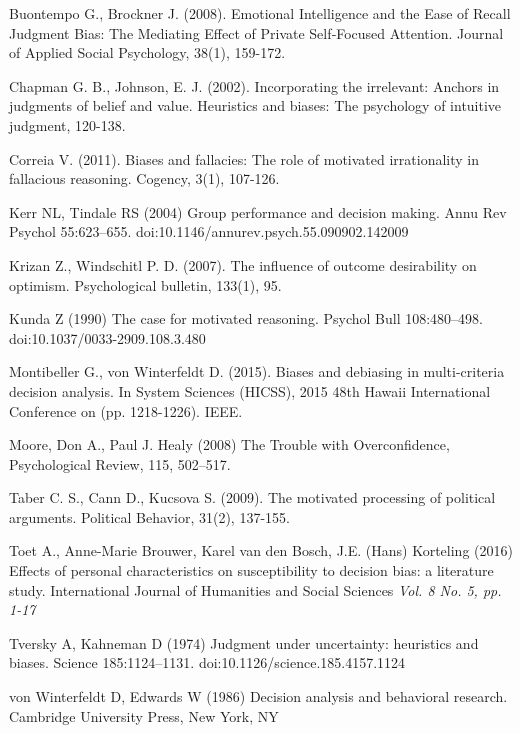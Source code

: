 \documentclass[a4paper,11pt]{article}
\begin{document}

\begin{thebibliography}{}

Buontempo G., Brockner J. (2008). Emotional Intelligence and the Ease of Recall Judgment Bias: The Mediating Effect of Private Self‐Focused Attention. Journal of Applied Social Psychology, 38(1), 159-172.

Chapman G. B., Johnson, E. J. (2002). Incorporating the irrelevant: Anchors in judgments of belief and value. Heuristics and biases: The psychology of intuitive judgment, 120-138.

Correia V. (2011). Biases and fallacies: The role of motivated irrationality in fallacious reasoning. Cogency, 3(1), 107-126.

Kerr NL, Tindale RS (2004) Group performance and decision making. Annu Rev Psychol 55:623–655. doi:10.1146/annurev.psych.55.090902.142009

Krizan Z., Windschitl P. D. (2007). The influence of outcome desirability on optimism. Psychological bulletin, 133(1), 95.

Kunda Z (1990) The case for motivated reasoning. Psychol Bull 108:480–498. doi:10.1037/0033-2909.108.3.480

Montibeller G., von Winterfeldt D. (2015). Biases and debiasing in multi-criteria decision analysis. In System Sciences (HICSS), 2015 48th Hawaii International Conference on (pp. 1218-1226). IEEE.

Moore, Don A., Paul J. Healy (2008) The Trouble with Overconfidence, Psychological Review, 115, 502–517.

Taber C. S., Cann D., Kucsova S. (2009). The motivated processing of political arguments. Political Behavior, 31(2), 137-155.

Toet A., Anne-Marie Brouwer, Karel van den Bosch, J.E. (Hans) Korteling (2016) Effects of personal characteristics on susceptibility to decision bias: a literature study. International Journal of Humanities and Social Sciences \textit{Vol. 8 No. 5, pp. 1-17}

Tversky A, Kahneman D (1974) Judgment under uncertainty: heuristics and biases. Science
185:1124–1131. doi:10.1126/science.185.4157.1124

von Winterfeldt D, Edwards W (1986) Decision analysis and behavioral research. Cambridge University Press, New York, NY



\end{thebibliography}
\end{document}
